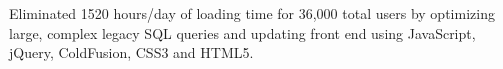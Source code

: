 \begin{cventries}
{\begin{cvitems}
        \item {Eliminated 1520 hours/day of loading time for 36,000 total users by optimizing large, complex legacy SQL queries and updating front end using JavaScript, jQuery, ColdFusion, CSS3 and HTML5.}
      \end{cvitems}
    }


\end{cventries}

